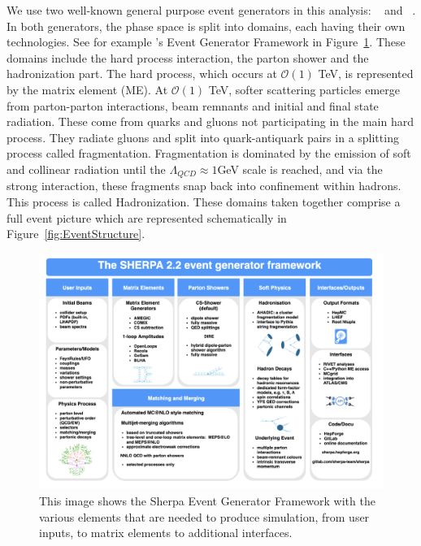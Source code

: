 We use two well-known general purpose event generators in this analysis: \SHERPA~\cite{Gleisberg:2008ta} and ~\cite{bierlich2022comprehensive, Sjostrand:2008za}. In both generators, the phase space is split into domains, each having their own technologies. See for example \SHERPA's Event Generator Framework in Figure~\ref{fig:sherpaDivideAndConquer}. These domains include the hard process interaction, the parton shower and the hadronization part. The hard process, which occurs at $\mathcal{O}(1)$ TeV, is represented by the matrix element (ME). At  $\mathcal{O}(1)$ TeV, softer scattering particles emerge from parton-parton interactions, beam remnants and initial and final state radiation. These come from quarks and gluons not participating in the main hard process. They radiate gluons and split into quark-antiquark pairs in a splitting process called fragmentation. Fragmentation is dominated by the emission of soft and collinear radiation until the $\Lambda_{QCD} \approx 1 $GeV scale is reached, and via the strong interaction, these fragments snap back into confinement within hadrons. This process is called Hadronization. These domains taken together comprise a full event picture which are represented schematically in Figure~\ref{fig:EventStructure}.

\begin{figure}[!htb]
	\centering
	\includegraphics[scale=0.5]{fig/SHERPAD&C.png}
	\caption{This image shows the Sherpa Event Generator Framework with the various elements that are needed to produce simulation, from user inputs, to matrix elements to additional interfaces.}
	\label{fig:sherpaDivideAndConquer}
\end{figure}

